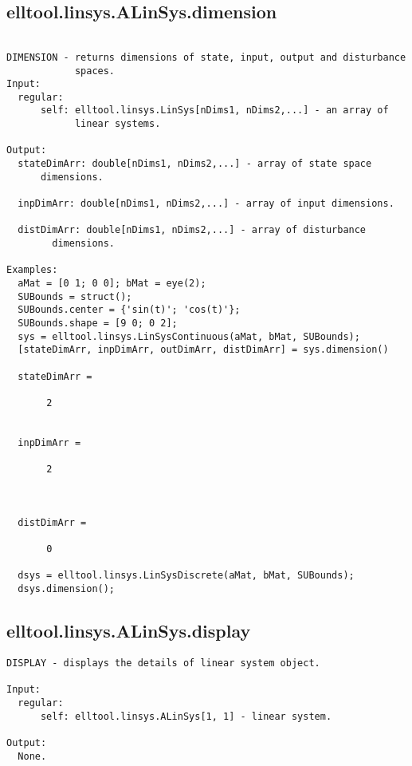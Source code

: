 \subsection{\texorpdfstring{elltool.linsys.ALinSys.dimension}{dimension}}\label{method:elltool.linsys.ALinSys.dimension}
\begin{verbatim}

DIMENSION - returns dimensions of state, input, output and disturbance
            spaces.
Input:
  regular:
      self: elltool.linsys.LinSys[nDims1, nDims2,...] - an array of
            linear systems.

Output:
  stateDimArr: double[nDims1, nDims2,...] - array of state space
      dimensions.

  inpDimArr: double[nDims1, nDims2,...] - array of input dimensions.

  distDimArr: double[nDims1, nDims2,...] - array of disturbance
        dimensions.

Examples:
  aMat = [0 1; 0 0]; bMat = eye(2);
  SUBounds = struct();
  SUBounds.center = {'sin(t)'; 'cos(t)'};
  SUBounds.shape = [9 0; 0 2];
  sys = elltool.linsys.LinSysContinuous(aMat, bMat, SUBounds);
  [stateDimArr, inpDimArr, outDimArr, distDimArr] = sys.dimension()

  stateDimArr =

       2


  inpDimArr =

       2



  distDimArr =

       0

  dsys = elltool.linsys.LinSysDiscrete(aMat, bMat, SUBounds);
  dsys.dimension();
\end{verbatim}
\subsection{\texorpdfstring{elltool.linsys.ALinSys.display}{display}}\label{method:elltool.linsys.ALinSys.display}
\begin{verbatim}
DISPLAY - displays the details of linear system object.

Input:
  regular:
      self: elltool.linsys.ALinSys[1, 1] - linear system.

Output:
  None.
\end{verbatim}
